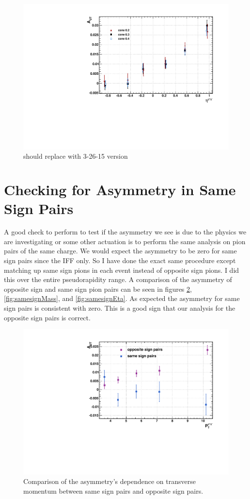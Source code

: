 \documentclass[abstract = on,listof=totoc, bibliography=totoc]{scrreprt}
\newcommand{\etapair}{\eta^{\pi^+\pi^-}}
\begin{document}
\begin{figure}
\begin{center}
\includegraphics[width = .7\textwidth]{allConesEta}
\caption[Asymmetry vs $\etapair$ for different cone radii]{should replace with 3-26-15 version}
\label{fig:allConesEta}
\end{center}
\end{figure}





\section{Checking for Asymmetry in Same Sign Pairs}
A good check to perform to test if the asymmetry we see is due to the physics we are investigating or some other actuation is to perform the same analysis on pion pairs of the same charge. We would expect the asymmetry to be zero for same sign pairs since the IFF only. So I have done the exact same procedure except matching up same sign pions in each event instead of opposite sign pions. I did this over the entire pseudorapidity range. A comparison of the asymmetry of opposite sign and same sign pion pairs can be seen in figures \ref{fig:samesignPt}, \ref{fig:samesignMass}, and \ref{fig:samesignEta}. As expected the asymmetry for same sign pairs is consistent with zero. This is a good sign that our analysis for the opposite sign pairs is correct. 

\begin{figure}[b!]
\begin{center}
\includegraphics[width = .7\textwidth]{asymVsPt_SameOpp}
\caption[comparison of $P_T$ asymmetry between same sign and opposite sign pairs]{Comparison of the asymmetry's dependence on transverse momentum between same sign pairs and opposite sign pairs.}
\label{fig:samesignPt}
\end{center}
\end{figure}
\end{document}
